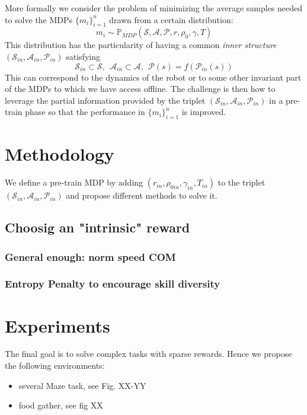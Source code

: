 \documentclass{article} %
\begin{document}
More formally we consider the problem of minimizing the average samples needed to solve the MDPs $\{m_i\}_{i=1}^n$ drawn from a certain distribution:
\begin{equation}
    m_i \sim \mathbb{P}_{MDP} (\mathcal{S}, \mathcal{A}, \mathcal{P}, r, \rho_0, \gamma, T)
\end{equation}
This distribution has the particularity of having a common \textit{inner structure} $(\mathcal{S}_{in}, \mathcal{A}_{in}, \mathcal{P}_{in})$ satisfying 
$$\mathcal{S}_{in} \subset \mathcal{S},~~ \mathcal{A}_{in} \subset \mathcal{A},~~ \mathcal{P}(s)=f(\mathcal{P}_{in}(s))$$
This can correspond to the dynamics of the robot or to some other invariant part of the MDPs to which we have access offline. The challenge is then how to leverage the partial information provided by the triplet $(\mathcal{S}_{in}, \mathcal{A}_{in}, \mathcal{P}_{in})$ in a pre-train phase so that the performance in $\{m_i\}_{i=1}^n$ is improved.

\section{Methodology}

We define a pre-train MDP by adding $(r_{in}, \rho_{0in}, \gamma_{in}, T_{in})$ to the triplet $(\mathcal{S}_{in}, \mathcal{A}_{in}, \mathcal{P}_{in})$ and propose different methods to solve it.

\subsection{Choosig an "intrinsic" reward}
\subsubsection{General enough: norm speed COM}

\subsubsection{Entropy Penalty to encourage skill diversity}

\section{Experiments}
The final goal is to solve complex tasks with sparse rewards. Hence we propose the following environments:
\begin{itemize}
    \item several Maze task, see Fig. XX-YY
    \item food gather, see fig XX
\end{itemize}
\end{document}
